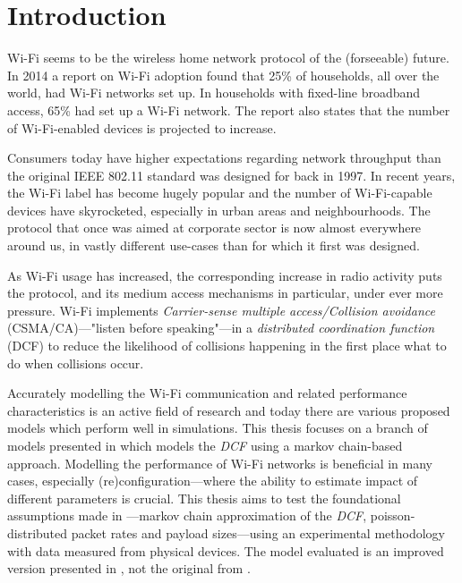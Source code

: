 
\chapter{Introduction}

Wi-Fi seems to be the wireless home network protocol of the (forseeable)
future. In 2014 a report on Wi-Fi adoption found that 25\% of households, all
over the world, had Wi-Fi networks set up. In households with fixed-line
broadband access, 65\% had set up a Wi-Fi network\cite{smith}. The report also
states that the number of Wi-Fi-enabled devices is projected to increase.

Consumers today have higher expectations regarding network throughput than the
original IEEE 802.11 standard was designed for back in 1997. In recent years,
the Wi-Fi label has become hugely popular and the number of Wi-Fi-capable
devices have skyrocketed, especially in urban areas and neighbourhoods. The
protocol that once was aimed at corporate sector is now almost everywhere
around us, in vastly different use-cases than for which it first was designed.

As Wi-Fi usage has increased, the corresponding increase in radio activity
puts the protocol, and its medium access mechanisms in particular, under ever
more pressure. Wi-Fi implements \emph{Carrier-sense multiple access/Collision
avoidance} (CSMA/CA)—"listen before speaking"—in a \emph{distributed
coordination function} (DCF) to reduce the likelihood of collisions happening
in the first place what to do when collisions occur. 

Accurately modelling the Wi-Fi communication and related performance
characteristics is an active field of research and today there are various
proposed models which perform well in simulations. This thesis focuses on a
branch of models presented in \cite{bianchi} which models the \emph{DCF} using
a markov chain-based approach. Modelling the performance of Wi-Fi networks is
beneficial in many cases, especially (re)configuration—where the ability to
estimate impact of different parameters is crucial. This thesis aims to test
the foundational assumptions made in \cite{bianchi}—markov chain approximation
of the \emph{DCF}, poisson-distributed packet rates and payload sizes—using an
experimental methodology with data measured from physical devices. The model
evaluated is an improved version presented in \cite{felemban}, not the
original from \cite{bianchi}.

